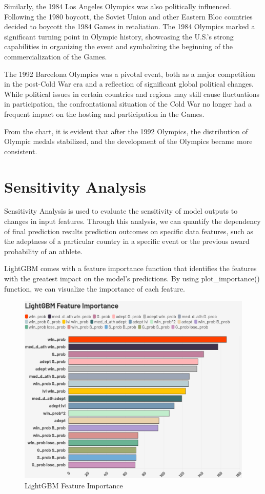 \documentclass[12pt]{article}  %
\begin{document}
Similarly, the 1984 Los Angeles Olympics was also politically influenced. Following the 1980 boycott, the Soviet Union and other Eastern Bloc countries decided to boycott the 1984 Games in retaliation. The 1984 Olympics marked a significant turning point in Olympic history, showcasing the U.S.'s strong capabilities in organizing the event and symbolizing the beginning of the commercialization of the Games.

The 1992 Barcelona Olympics was a pivotal event, both as a major competition in the post-Cold War era and a reflection of significant global political changes. While political issues in certain countries and regions may still cause fluctuations in participation, the confrontational situation of the Cold War no longer had a frequent impact on the hosting and participation in the Games.

From the chart, it is evident that after the 1992 Olympics, the distribution of Olympic medals stabilized, and the development of the Olympics became more consistent.



\section{Sensitivity Analysis}

Sensitivity Analysis is used to evaluate the sensitivity of model outputs to changes in input features. Through this analysis, we can quantify the dependency of final prediction results prediction outcomes on specific data features, such as the adeptness of a particular country in a specific event or the previous award probability of an athlete.

LightGBM comes with a feature importance function that identifies the features with the greatest impact on the model’s predictions. By using plot\_importance() function, we can visualize the importance of each feature.


\begin{figure}[H]
	\centering
	\includegraphics[width=14cm]{img/Sensitive Analysis 1.png}
	\caption{LightGBM Feature Importance}
	\label{fig:aa}
\end{figure}
\end{document}
